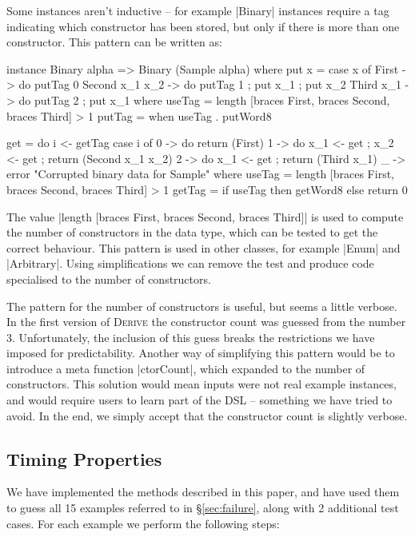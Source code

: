 \documentclass{llncs}
\newcommand{\derive}{\textsc{Derive}}
\begin{document}
Some instances aren't inductive -- for example |Binary| instances require a tag indicating which constructor has been stored, but only if there is more than one constructor. This pattern can be written as:

\begin{code}
instance Binary alpha => Binary (Sample alpha) where
    put x = case x of
        First            -> do putTag 0
        Second  x_1 x_2  -> do putTag 1 ; put x_1 ; put x_2
        Third   x_1      -> do putTag 2 ; put x_1
        where
            useTag = length [braces First, braces Second, braces Third] > 1
            putTag = when useTag . putWord8

    get = do
        i <- getTag
        case i of
            0 -> do return (First)
            1 -> do x_1 <- get ; x_2 <- get ; return (Second x_1 x_2)
            2 -> do x_1 <- get ; return (Third x_1)
            _ -> error "Corrupted binary data for Sample"
        where
            useTag = length [braces First, braces Second, braces Third] > 1
            getTag = if useTag then getWord8 else return 0
\end{code}

The value |length [braces First, braces Second, braces Third]| is used to compute the number of constructors in the data type, which can be tested to get the correct behaviour. This pattern is used in other classes, for example |Enum| and |Arbitrary|. Using simplifications we can remove the test and produce code specialised to the number of constructors.

The pattern for the number of constructors is useful, but seems a little verbose. In the first version of \derive{} the constructor count was guessed from the number 3. Unfortunately, the inclusion of this guess breaks the restrictions we have imposed for predictability. Another way of simplifying this pattern would be to introduce a meta function |ctorCount|, which expanded to the number of constructors. This solution would mean inputs were not real example instances, and would require users to learn part of the DSL -- something we have tried to avoid. In the end, we simply accept that the constructor count is slightly verbose.

\subsection{Timing Properties}

We have implemented the methods described in this paper, and have used them to guess all 15 examples referred to in \S\ref{sec:failure}, along with 2 additional test cases. For each example we perform the following steps:
\end{document}

